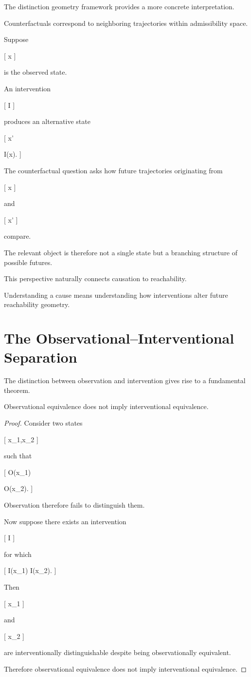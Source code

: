 \documentclass[11pt,oneside,openany]{book}
\begin{document}
The distinction geometry framework provides a more concrete interpretation.

Counterfactuals correspond to neighboring trajectories within admissibility space.

Suppose

[
x
]

is the observed state.

An intervention

[
I
]

produces an alternative state

[
x'

I(x).
]

The counterfactual question asks how future trajectories originating from

[
x
]

and

[
x'
]

compare.

The relevant object is therefore not a single state but a branching structure of possible futures.

This perspective naturally connects causation to reachability.

Understanding a cause means understanding how interventions alter future reachability geometry.

\section{The Observational--Interventional Separation}

The distinction between observation and intervention gives rise to a fundamental theorem.

\begin{theorem}

Observational equivalence does not imply interventional equivalence.

\end{theorem}

\begin{proof}

Consider two states

[
x_1,x_2
]

such that

[
O(x_1)

O(x_2).
]

Observation therefore fails to distinguish them.

Now suppose there exists an intervention

[
I
]

for which

[
I(x_1)
\neq
I(x_2).
]

Then

[
x_1
]

and

[
x_2
]

are interventionally distinguishable despite being observationally equivalent.

Therefore observational equivalence does not imply interventional equivalence.

\end{proof}
\end{document}

